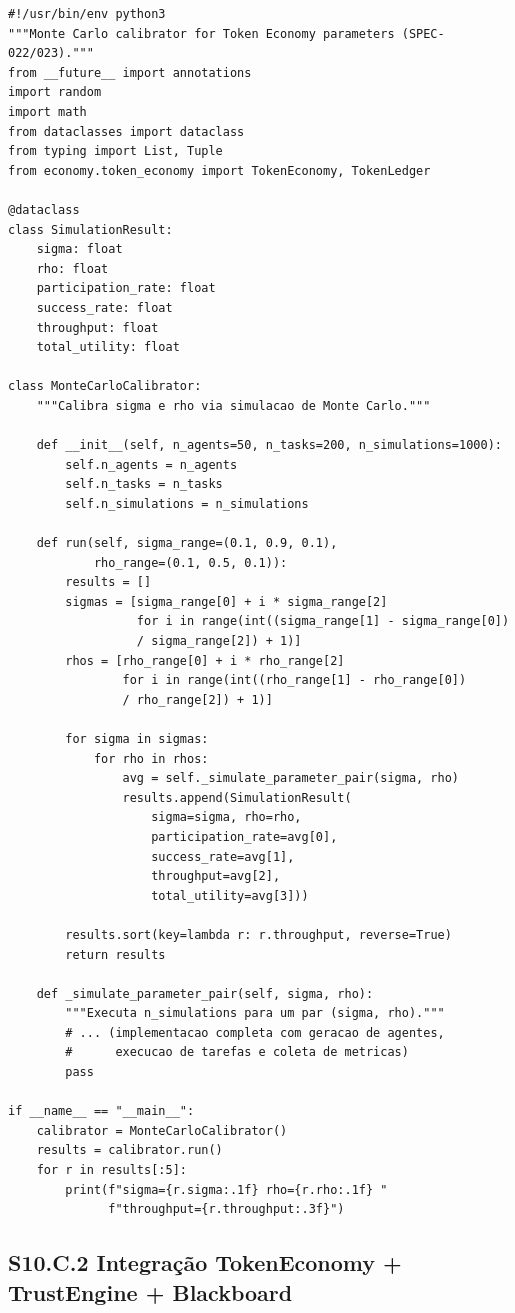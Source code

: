 \begin{verbatim}
#!/usr/bin/env python3
"""Monte Carlo calibrator for Token Economy parameters (SPEC-022/023)."""
from __future__ import annotations
import random
import math
from dataclasses import dataclass
from typing import List, Tuple
from economy.token_economy import TokenEconomy, TokenLedger

@dataclass
class SimulationResult:
    sigma: float
    rho: float
    participation_rate: float
    success_rate: float
    throughput: float
    total_utility: float

class MonteCarloCalibrator:
    """Calibra sigma e rho via simulacao de Monte Carlo."""

    def __init__(self, n_agents=50, n_tasks=200, n_simulations=1000):
        self.n_agents = n_agents
        self.n_tasks = n_tasks
        self.n_simulations = n_simulations

    def run(self, sigma_range=(0.1, 0.9, 0.1),
            rho_range=(0.1, 0.5, 0.1)):
        results = []
        sigmas = [sigma_range[0] + i * sigma_range[2]
                  for i in range(int((sigma_range[1] - sigma_range[0])
                  / sigma_range[2]) + 1)]
        rhos = [rho_range[0] + i * rho_range[2]
                for i in range(int((rho_range[1] - rho_range[0])
                / rho_range[2]) + 1)]

        for sigma in sigmas:
            for rho in rhos:
                avg = self._simulate_parameter_pair(sigma, rho)
                results.append(SimulationResult(
                    sigma=sigma, rho=rho,
                    participation_rate=avg[0],
                    success_rate=avg[1],
                    throughput=avg[2],
                    total_utility=avg[3]))

        results.sort(key=lambda r: r.throughput, reverse=True)
        return results

    def _simulate_parameter_pair(self, sigma, rho):
        """Executa n_simulations para um par (sigma, rho)."""
        # ... (implementacao completa com geracao de agentes,
        #      execucao de tarefas e coleta de metricas)
        pass

if __name__ == "__main__":
    calibrator = MonteCarloCalibrator()
    results = calibrator.run()
    for r in results[:5]:
        print(f"sigma={r.sigma:.1f} rho={r.rho:.1f} "
              f"throughput={r.throughput:.3f}")
\end{verbatim}

\subsection*{S10.C.2 Integração TokenEconomy + TrustEngine + Blackboard}

